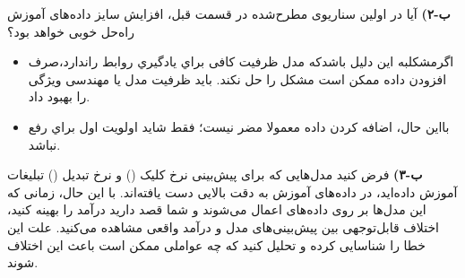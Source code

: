 \documentclass[12pt]{article}
\begin{document}
\begin{enumerate}
    \textbf{ب-۲)}
    آیا در اولین سناریوی مطرح‌شده در قسمت قبل، افزایش سایز داده‌های آموزش راه‌حل خوبی خواهد بود؟\\
    \textcolor{blu}{
    \begin{itemize}
                \item اگرمشکلبه این دلیل باشدکه مدل ظرفیت کافی براي یادگیري روابط راندارد،صرف
                افزودن داده ممکن است مشکل را حل نکند. باید ظرفیت مدل یا مهندسی ویژگی را بهبود داد.
                \item بااین حال، اضافه کردن داده معمولا مضر نیست؛ فقط شاید اولویت اول براي رفع  نباشد.
            \end{itemize}
    }
    
    \textbf{ب-۳)}
    فرض کنید مدل‌هایی که برای پیش‌بینی نرخ کلیک () و نرخ تبدیل () تبلیغات آموزش داده‌اید، در داده‌های آموزش به دقت بالایی دست یافته‌اند. با این حال، زمانی که این مدل‌ها بر روی داده‌های  اعمال می‌شوند و شما قصد دارید درآمد را بهینه کنید، اختلاف قابل‌توجهی بین پیش‌بینی‌های مدل و درآمد واقعی مشاهده می‌کنید. علت این خطا را شناسایی کرده و تحلیل کنید که چه عواملی ممکن است باعث این اختلاف شوند.
    

\end{enumerate}
\end{document}
